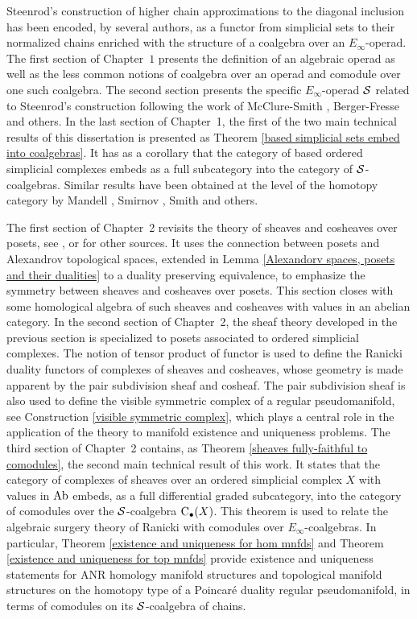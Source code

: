 \documentclass[12pt,oneside]{book}
\begin{document}
    Steenrod's construction of higher chain approximations to the diagonal inclusion has been encoded, by several authors, as a functor from simplicial sets to their normalized chains enriched with the structure of a coalgebra over an $E_\infty$-operad. The first section of Chapter~$1$ presents the definition of an algebraic operad as well as the less common notions of coalgebra over an operad and comodule over one such coalgebra. The second section presents the specific $E_\infty$-operad $\S$ related to Steenrod's construction following the work of McClure-Smith \cite{MS03}, Berger-Fresse \cite{BF04} and others. In the last section of Chapter~1, the first of the two main technical results of this dissertation is presented as Theorem \ref{based simplicial sets embed into coalgebras}. It has as a corollary that the category of based ordered simplicial complexes embeds as a full subcategory into the category of $\S$-coalgebras. Similar results have been obtained at the level of the homotopy category by Mandell \cite{Man06}, Smirnov \cite{Smi98}, Smith \cite{Smi15} and others.

    The first section of Chapter~2 revisits the theory of sheaves and cosheaves over posets, see \cite{Cur13}, \cite{she85} or \cite{Lad08} for other sources. It uses the connection between posets and Alexandrov topological spaces, extended in Lemma \ref{Alexandorv spaces, posets and their dualities} to a duality preserving equivalence, to emphasize the symmetry between sheaves and cosheaves over posets. This section closes with some homological algebra of such sheaves and cosheaves with values in an abelian category. In the second section of Chapter~2, the sheaf theory developed in the previous section is specialized to posets associated to ordered simplicial complexes. The notion of tensor product of functor is used to define the Ranicki duality functors of complexes of sheaves and cosheaves, whose geometry is made apparent by the pair subdivision sheaf and cosheaf. The pair subdivision sheaf is also used to define the visible symmetric complex of a regular pseudomanifold, see Construction \ref{visible symmetric complex}, which plays a central role in the application of the theory to manifold existence and uniqueness problems. The third section of Chapter~2 contains, as Theorem \ref{sheaves fully-faithful to comodules}, the second main technical result of this work. It states that the category of complexes of sheaves over an ordered simplicial complex $X$ with values in $\Ab$ embeds, as a full differential graded subcategory, into the category of comodules over the $\S$-coalgebra $\chains(X)$. This theorem is used to relate the algebraic surgery theory of Ranicki with comodules over $E_\infty$-coalgebras. In particular, Theorem \ref{existence and uniqueness for hom mnfds} and Theorem \ref{existence and uniqueness for top mnfds} provide existence and uniqueness statements for ANR homology manifold structures and topological manifold structures on the homotopy type of a Poincar\'e duality regular pseudomanifold, in terms of comodules on its $\S$-coalgebra of chains.
\end{document}
